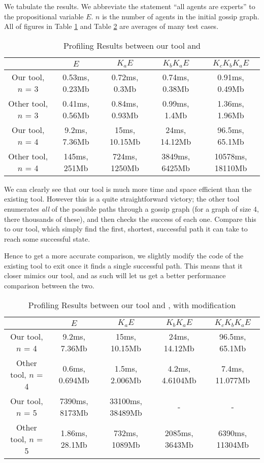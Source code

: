 \documentclass[ %
                    author={Leo Poulson},
                supervisor={Dr. Steven Ramsay},
                    degree={BSc},
                     title={Epistemic Planning for the Dynamic Gossip problem},
                  subtitle={},
                      year={2019} ]{dissertation}
\begin{document}
We tabulate the results. We abbreviate the statement ``all agents are
experts'' to the propositional variable $E$. $n$ is the number of agents in the
initial gossip graph. All of figures in Table \ref{tab:Proflining1} and Table
\ref{tab:Proflining2} are averages of many test cases. 

\begin{table}[h]
  \centering
  \begin{tabular}{|c||c|c|c|c|}
    \hline
    & $E$ & $ K_a E$ & $K_b K_a E$ & $K_c K_b K_a E$ \\ \hline 
    Our tool, $n$ = 3 & 0.53ms, 0.23Mb & 0.72ms, 0.3Mb & 0.74ms, 0.38Mb & 0.91ms, 0.49Mb \\ \hline
    Other tool, $n$ = 3 & 0.41ms, 0.56Mb & 0.84ms, 0.93Mb & 0.99ms, 1.4Mb & 1.36ms, 1.96Mb \\ \hline \hline
    Our tool, $n$ = 4   & 9.2ms, 7.36Mb & 15ms, 10.15Mb & 24ms, 14.12Mb & 96.5ms, 65.1Mb \\ \hline
    Other tool, $n$ = 4 & 145ms, 251Mb & 724ms, 1250Mb & 3849ms, 6425Mb & 10578ms, 18110Mb \\ 
    \hline
  \end{tabular}
  \caption{Profiling Results between our tool and \cite{GithubGossip}}
  \label{tab:Proflining1}
\end{table}

We can clearly see that our tool is much more time and space efficient than the
existing tool. However this is a quite straightforward victory; the other tool
enumerates \emph{all} of the possible paths through a gossip graph (for a
graph of size 4, there thousands of these), and then checks the success of each
one. Compare this to our tool, which simply find the first, shortest, successful
path it can take to reach some successful state.

Hence to get a more accurate comparison, we slightly modify the code of the
existing tool to exit once it finds a single successful path. This means that it
closer mimics our tool, and as such will let us get a better performance
comparison between the two. 


\begin{table}[h]
  \centering
  \begin{tabular}{|c||c|c|c|c|}
    \hline
    & $E$ & $ K_a E$ & $K_b K_a E$ & $K_c K_b K_a E$ \\ \hline 
    Our tool, $n$ = 4 & 9.2ms, 7.36Mb & 15ms, 10.15Mb & 24ms, 14.12Mb & 96.5ms, 65.1Mb \\ \hline
    Other tool, $n$ = 4 & 0.6ms, 0.694Mb & 1.5ms, 2.006Mb & 4.2ms, 4.6104Mb & 7.4ms, 11.077Mb \\ \hline \hline
    Our tool, $n$ = 5 & 7390ms, 8173Mb & 33100ms, 38489Mb & - & - \\ \hline
    Other tool, $n$ = 5 & 1.86ms, 28.1Mb & 732ms, 1089Mb & 2085ms, 3643Mb & 6390ms, 11304Mb \\
    \hline
  \end{tabular}
  \caption{Profiling Results between our tool and \cite{GithubGossip}, with modification}
  \label{tab:Proflining2}
\end{table}
\end{document}
